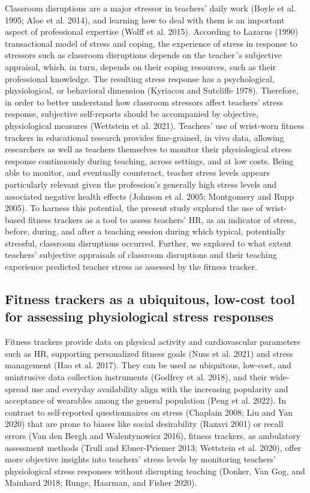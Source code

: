 \documentclass[preprint,
3p]{elsarticle} %
\begin{document}
Classroom disruptions are a major stressor in teachers' daily work
(Boyle et al. 1995; Aloe et al. 2014), and learning how to deal with
them is an important aspect of professional expertise (Wolff et al.
2015). According to Lazarus (1990) transactional model of stress and
coping, the experience of stress in response to stressors such as
classroom disruptions depends on the teacher´s subjective appraisal,
which, in turn, depends on their coping resources, such as their
professional knowledge. The resulting stress response has a
psychological, physiological, or behavioral dimension (Kyriacou and
Sutcliffe 1978). Therefore, in order to better understand how classroom
stressors affect teachers' stress response, subjective self-reports
should be accompanied by objective, physiological measures (Wettstein et
al. 2021). Teachers' use of wrist-worn fitness trackers in educational
research provides fine-grained, in vivo data, allowing researchers as
well as teachers themselves to monitor their physiological stress
response continuously during teaching, across settings, and at low
costs. Being able to monitor, and eventually counteract, teacher stress
levels appears particularly relevant given the profession's generally
high stress levels and associated negative health effects (Johnson et
al. 2005; Montgomery and Rupp 2005). To harness this potential, the
present study explored the use of wrist-based fitness trackers as a tool
to assess teachers' HR, as an indicator of stress, before, during, and
after a teaching session during which typical, potentially stressful,
classroom disruptions occurred. Further, we explored to what extent
teachers' subjective appraisals of classroom disruptions and their
teaching experience predicted teacher stress as assessed by the fitness
tracker.

\subsection{Fitness trackers as a ubiquitous, low-cost tool for
assessing physiological stress
responses}\label{fitness-trackers-as-a-ubiquitous-low-cost-tool-for-assessing-physiological-stress-responses}

Fitness trackers provide data on physical activity and cardiovascular
parameters such as HR, supporting personalized fitness goals (Nuss et
al. 2021) and stress management (Hao et al. 2017). They can be used as
ubiquitous, low-cost, and unintrusive data collection instruments
(Godfrey et al. 2018), and their wide-spread use and everyday
availability align with the increasing popularity and acceptance of
wearables among the general population (Peng et al. 2022). In contrast
to self-reported questionnaires on stress (Chaplain 2008; Liu and Yan
2020) that are prone to biases like social desirability (Razavi 2001) or
recall errors (Van den Bergh and Walentynowicz 2016), fitness trackers,
as ambulatory assessment methods (Trull and Ebner-Priemer 2013;
Wettstein et al. 2020), offer more objective insights into teachers'
stress levels by monitoring teachers' physiological stress responses
without disrupting teaching (Donker, Van Gog, and Mainhard 2018; Runge,
Haarman, and Fisher 2020).
\end{document}
